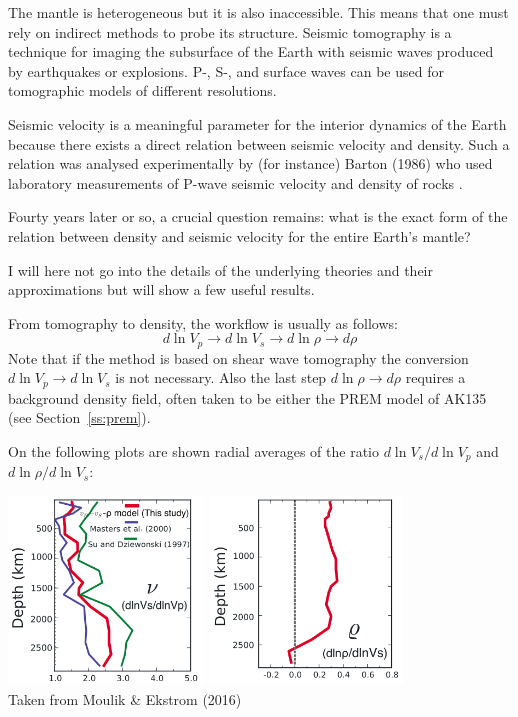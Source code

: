 
The mantle is heterogeneous but it is also inaccessible. This means that one must rely on indirect methods 
to probe its structure. Seismic tomography is a technique for imaging the subsurface of 
the Earth with seismic waves produced by earthquakes or explosions. 
P-, S-, and surface waves can be used for tomographic models of different resolutions.

Seismic velocity is a meaningful parameter for the interior dynamics of the
Earth because there exists a direct relation between seismic velocity and density. 
Such a relation was analysed experimentally by (for instance) Barton (1986) who 
used laboratory measurements of P-wave seismic velocity and density of rocks \cite{bart86}. 

Fourty years later or so, a crucial question remains: what is the exact form of the 
relation between density and seismic velocity for the entire Earth's mantle?

I will here not go into the details of the underlying theories and their approximations but 
will show a few useful results. 

From tomography to density, the workflow is usually as follows:
\[
d \ln V_p \rightarrow d \ln V_s \rightarrow d \ln \rho \rightarrow d\rho
\]
Note that if the method is based on shear wave tomography the conversion $d \ln V_p \rightarrow d \ln V_s$
is not necessary. 
Also the last step $d \ln \rho \rightarrow d\rho$ requires a background density field, 
often taken to be either the PREM model of AK135 (see Section~\ref{ss:prem}). 

On the following plots are shown radial averages of the ratio $d \ln V_s/d\ln V_p$ and 
$d\ln \rho/d \ln V_s$:

\begin{center}
\includegraphics[height=5cm]{images/dlnvsdlnrho/moek16b}
\includegraphics[height=5cm]{images/dlnvsdlnrho/moek16a}\\
{\captionfont Taken from Moulik \& Ekstrom (2016) \cite{moek16}}
\end{center}

